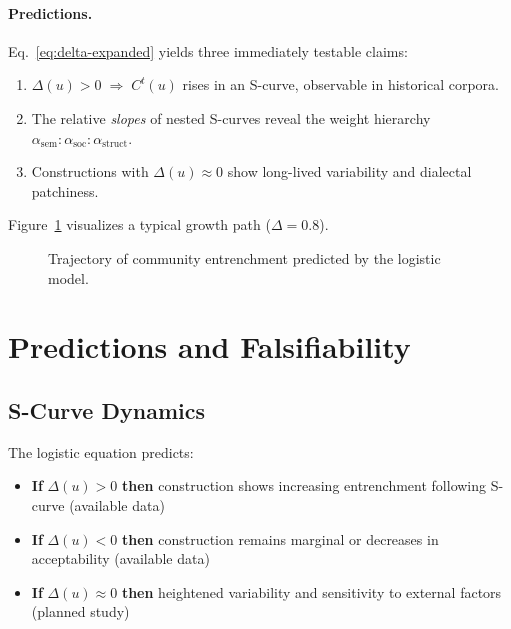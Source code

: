 \documentclass[12pt]{article}
\begin{document}
\paragraph{Predictions.}
Eq.~\eqref{eq:delta-expanded} yields three immediately testable claims:

\begin{enumerate}
  \item $\Delta(u)\!>\!0 \;\Rightarrow\; C^{t}(u)$ rises in an S-curve, observable in historical corpora.
  \item The relative \emph{slopes} of nested S-curves reveal the weight hierarchy $\alpha_{\text{sem}}{:}\alpha_{\text{soc}}{:}\alpha_{\text{struct}}$.
  \item Constructions with $\Delta(u)\!\approx\!0$ show long-lived variability and dialectal patchiness.
\end{enumerate}

Figure~\ref{fig:trajectory} visualizes a typical growth path ($\Delta\!=\!0.8$).

\begin{figure}[t]
  \centering
  \caption{Trajectory of community entrenchment predicted by the
    logistic model.}
  \label{fig:trajectory}
\end{figure}


\section{Predictions and Falsifiability}

\subsection{S-Curve Dynamics}

The logistic equation predicts:
\begin{itemize}
\item \textbf{If} $\Delta(u) > 0$ \textbf{then} construction shows increasing entrenchment following S-curve (available data)
\item \textbf{If} $\Delta(u) < 0$ \textbf{then} construction remains marginal or decreases in acceptability (available data)
\item \textbf{If} $\Delta(u) \approx 0$ \textbf{then} heightened variability and sensitivity to external factors (planned study)
\end{itemize}
\end{document}
